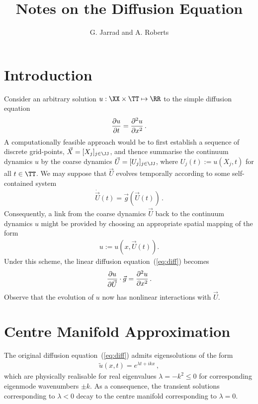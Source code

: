 \documentclass[12pt,a5paper]{article}
\title{Notes on the Diffusion Equation}
\author{G. Jarrad and A. Roberts}
\begin{document}
\maketitle
{}
\section{Introduction}\label{sec:intro}
Consider an arbitrary solution $u:\XX\times \TT\mapsto \RR$ to the simple diffusion equation 
\begin{eqnarray}
	\D tu = \DD xu\,.
	\label{eq:diff}
\end{eqnarray}
A computationally feasible approach would be to 
first establish a sequence  of discrete grid-points,
${\vec X}=[X_j]_{j\in\JJ}$, and thence
summarise the continuum dynamics $u$ by the coarse dynamics
${\vec U}=[U_j]_{j\in\JJ}$, where $U_j(t):=u(X_j,t)$ for all $t\in \TT$.
We may suppose  that ${\vec U}$ evolves temporally according to some self-contained system
\begin{eqnarray}
	\dot{\vec U}(t) = {\vec g}({\vec U}(t))\,.
	\label{eq:temporal}
\end{eqnarray}
Consequently, a link from the coarse dynamics ${\vec U}$ back to the continuum dynamics $u$ might be provided
by choosing an appropriate spatial mapping of the form
\begin{eqnarray}
	u  := u(x,{\vec U}(t)).
	\label{eq:spatial}
\end{eqnarray}
Under this scheme, the linear diffusion equation~(\ref{eq:diff}) becomes
\begin{eqnarray}
	\D {\vec U}{u}\cdot{\vec g} = \DD x{u}\,.
	\label{eq:diff2}
\end{eqnarray}
Observe that the evolution of $u$ now has nonlinear interactions with ${\vec U}$.

\section{Centre Manifold Approximation}\label{sec:centre-man}
The original diffusion equation~(\ref{eq:diff}) admits 
eigensolutions of the form
\begin{eqnarray}
	\tilde{u}(x,t)  = e^{\lambda t+ikx}\,,
\label{eq:raw-eigmode}
\end{eqnarray}
which are physically realisable for real eigenvalues $\lambda=-k^2\le 0$ for 
corresponding eigenmode wavenumbers $\pm k$. 
As a consequence, the transient solutions corresponding
to $\lambda<0$ decay to the centre manifold corresponding to $\lambda=0$. 
\end{document}
